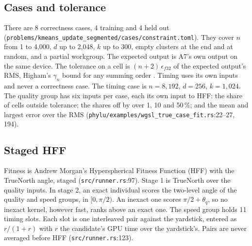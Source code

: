 \documentclass[sigconf,nonacm]{acmart}
\newcommand{\src}[1]{{\footnotesize\nolinkurl{#1}}}
\begin{document}
\subsection{Cases and tolerance}
There are 8 correctness cases, 4 training and 4 held out
(\src{problems/kmeans_update_segmented/cases/constraint.toml}). They cover
$n$ from 1 to 4,000, $d$ up to 2,048, $k$ up to 300, empty clusters at the end
and at random, and a partial workgroup. The expected output is A7's own output
on the same device. The tolerance on a cell is $(n+2)\,\epsilon_{f32}$ of the
expected output's RMS, Higham's $\gamma_n$ bound for any summing order
\cite{higham2002}. Timing uses its own inputs and never a correctness case. The
timing case is $n=8{,}192$, $d=256$, $k=1{,}024$. The quality group has six
inputs per case, each its own input to HFF: the share of cells outside
tolerance; the shares off by over 1, 10 and 50\,\%; and the mean and largest
error over the RMS (\src{phylu/examples/wgsl_true_case_fit.rs}:22--27, 194).

\subsection{Staged HFF}
Fitness is Andrew Morgan's Hyperspherical Fitness Function (HFF)
\cite{morgan2026hff} with the TrueNorth angle, staged
(\src{src/runner.rs}:97). Stage 1 is TrueNorth over the quality inputs. In
stage 2, an exact individual scores the two-level angle of the quality and
speed groups, in $[0,\pi/2)$. An inexact one scores $\pi/2+\theta_q$, so no
inexact kernel, however fast, ranks above an exact one. The speed group holds
11 timing slots. Each slot is one interleaved pair against the yardstick,
entered as $r/(1+r)$ with $r$ the candidate's GPU time over the yardstick's.
Pairs are never averaged before HFF (\src{src/runner.rs}:123).
\end{document}
